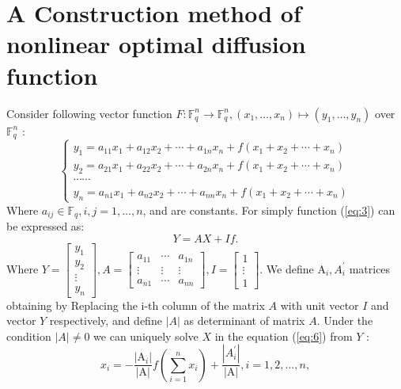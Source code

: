\documentclass[12pt,a4paper]{article}
\newcommand{\0}{\textbf{0}}
\newcommand{\1}{\textbf{1}}
\begin{document}
\section{A Construction method of nonlinear optimal diffusion function}
    Consider following vector function $F: \mathbb{F}_{{q}}^n \rightarrow \mathbb{F}_{{q}}^n,\left(x_{1}, \dots, x_{n}\right) \mapsto\left(y_{1}, \dots, y_{n}\right)$ over $\mathbb{F}_{{q}}^n$ :
    \begin{equation}\label{eq:6}
        \left\{\begin{array}{c}
            y_{1}=a_{11} x_{1}+a_{12} x_{2}+\cdots+a_{1 n} x_{n}+f\left(x_{1}+x_{2}+\cdots+x_{n}\right) \\
            y_{2}=a_{21} x_{1}+a_{22} x_{2}+\cdots+a_{2 n} x_{n}+f\left(x_{1}+x_{2}+\cdots+x_{n}\right) \\
            \cdots \cdots \\
            y_{n}=a_{n 1} x_{1}+a_{n 2} x_{2}+\cdots+a_{n n} x_{n}+f\left(x_{1}+x_{2}+\cdots+x_{n}\right)
        \end{array}\right.
    \end{equation}
    Where $a_{i j} \in \mathbb{F}_{{q}}, i, j=1, \dots, n$, and are constants.
    For simply function (\ref{eq:3}) can be expressed as:
    $$
    Y=AX+If.
    $$
    Where $Y=\left[\begin{array}{c}y_{1} \\ y_{2} \\ \vdots \\ y_{n}\end{array}\right], A=\left[\begin{array}{ccc}a_{11} & \cdots & a_{1 n} \\ \vdots & \vdots & \vdots \\ a_{n 1} & \cdots & a_{n n}\end{array}\right], I=\left[\begin{array}{c}1 \\ \vdots \\ 1\end{array}\right].$
    We define $\mathrm{A}_{i}, A_{i}^{\prime}$ matrices obtaining by Replacing the i-th column of the matrix $A$ with unit vector $I$ and vector $Y$ respectively, and define $|A|$ as determinant of matrix $A$. Under the condition $|A| \neq 0$ we can uniquely solve $X$ in the equation (\ref{eq:6}) from $Y$ :
    \begin{equation}\label{eq:7}
        x_{i}=-\frac{\left|\mathrm{A}_{i}\right|}{|\mathrm{A}|} f\left(\sum_{i=1}^{n} x_{i}\right)+\frac{\left|A_{i}^{\prime}\right|}{|\mathrm{A}|}, i=1,2, \dots, n,
    \end{equation}
\end{document}
